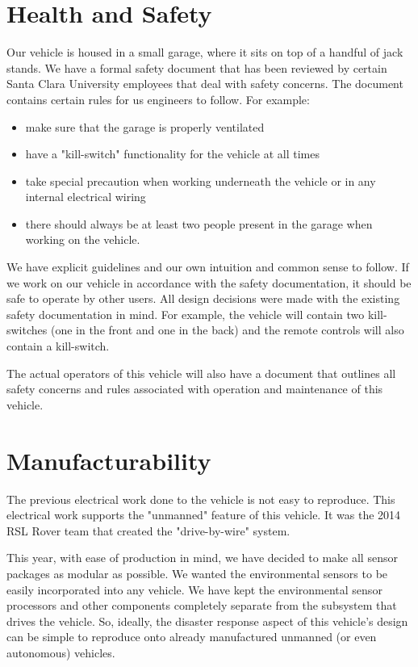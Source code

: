 \section{Health and Safety} Our vehicle is housed in a small garage, where it sits on top of a handful of jack stands. We have a formal safety document that has been reviewed by certain Santa Clara University employees that deal with safety concerns. The document contains certain rules for us engineers to follow. For example:	
\begin{itemize}
\item make sure that the garage is properly ventilated 
\item have a "kill-switch" functionality for the vehicle at all times 
\item take special precaution when working underneath the vehicle or in any internal electrical wiring
\item there should always be at least two people present in the garage when working on the vehicle. 
\end{itemize}
We have explicit guidelines and our own intuition and common sense to follow. If we work on our vehicle in accordance with the safety documentation, it should be safe to operate by other users. All design decisions were made with the existing safety documentation in mind. For example, the vehicle will contain two kill-switches (one in the front and one in the back) and the remote controls will also contain a kill-switch.

The actual operators of this vehicle will also have a document that outlines all safety concerns and rules associated with operation and maintenance of this vehicle. 


\section{Manufacturability} The previous electrical work done to the vehicle is not easy to reproduce. This electrical work supports the "unmanned" feature of this vehicle. It was the 2014 RSL Rover team that created the "drive-by-wire" system. \cite{rslrover2014} 

This year, with ease of production in mind, we have decided to make all sensor packages as modular as possible. We wanted the environmental sensors to be easily incorporated into any vehicle. We have kept the environmental sensor processors and other components completely separate from the subsystem that drives the vehicle. So, ideally, the disaster response aspect of this vehicle's design can be simple to reproduce onto already manufactured unmanned (or even autonomous) vehicles. 

